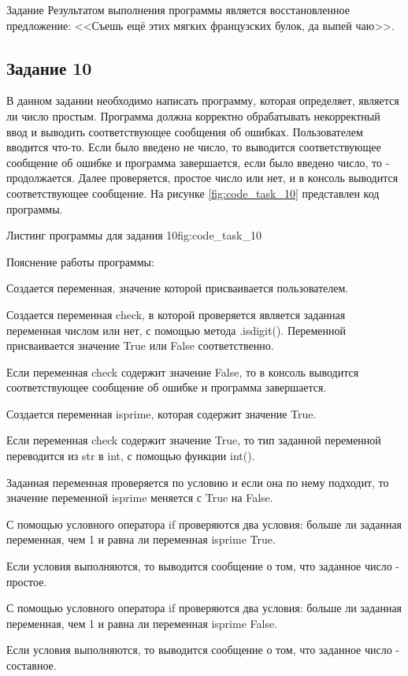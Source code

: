 \documentclass[]{vvsu}
\begin{document}
\begin{addition}{Задание}
Результатом выполнения программы является восстановленное предложение:
<<Съешь ещё этих мягких французских булок, да выпей чаю>>.

\subsection{Задание 10}

В данном задании необходимо написать программу, которая определяет, является ли число простым. Программа должна корректно обрабатывать некорректный ввод и выводить соответствующее сообщения об ошибках.  
Пользователем вводится что-то. Если было введено не число, то выводится соответствующее сообщение об ошибке и программа завершается, если было введено число, то - продолжается. Далее проверяется, простое число или нет, и в консоль выводится соответствующее сообщение.
На рисунке \ref{fig:code_task_10} представлен код программы.

\begin{vvsu_figure}{Листинг программы для задания 10}{fig:code_task_10}
  \begin{minipage}{.75\textwidth}
    
  \end{minipage}
\end{vvsu_figure}

Пояснение работы программы:
\begin{vvsu_list}
  \item Создается переменная, значение которой присваивается пользователем.
  \item Создается переменная check, в которой проверяется является заданная переменная числом или нет, с помощью метода .isdigit(). Переменной присваивается значение True или False соответственно.
  \item Если переменная check содержит значение False, то в консоль выводится соответствующее сообщение об ошибке и программа завершается.
  \item Создается переменная isprime, которая содержит значение True.
  \item Если переменная check содержит значение True, то тип заданной переменной переводится из str в int, с помощью функции int().
  \item Заданная переменная проверяется по условию и если она по нему подходит, то значение переменной isprime меняется с True на False.
  \item С помощью условного оператора if проверяются два условия: больше ли заданная переменная, чем 1 и равна ли переменная isprime True.
  \item Если условия выполняются, то выводится сообщение о том, что заданное число - простое.
  \item С помощью условного оператора if проверяются два условия: больше ли заданная переменная, чем 1 и равна ли переменная isprime False.
  \item Если условия выполняются, то выводится сообщение о том, что заданное число - составное.
\end{vvsu_list}


\end{addition}
\end{document}
